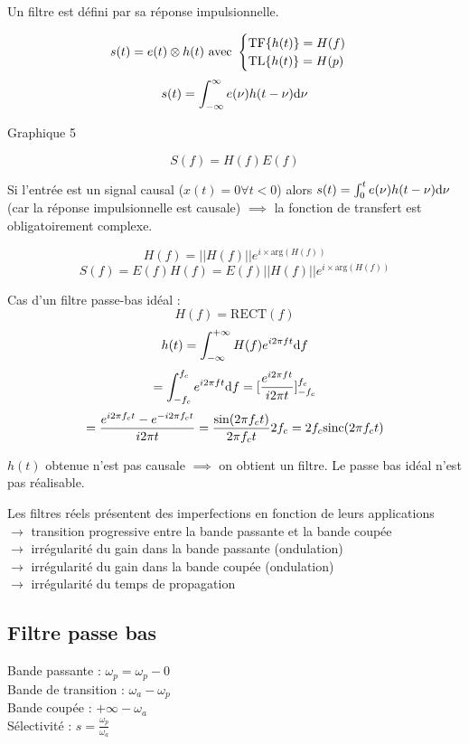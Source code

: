 \documentclass[a4paper,12pt]{article}
\begin{document}
Un filtre est défini par sa réponse impulsionnelle.

\[ s(t) = e(t) \otimes h(t) \text{ avec } \begin{cases}
    \mathrm{TF} \{ h(t) \} = H(f) \\
    \mathrm{TL} \{ h(t) \} = H(p)
\end{cases} \]
\[ s(t) = \int_{-\infty}^{\infty} e(\nu) h(t-\nu) \mathrm{d}\nu \]

{\Large Graphique 5}

\[ S(f) = H(f) E(f) \]

Si l'entrée est un signal causal ($x(t) = 0 \forall t < 0$) alors $s(t) = \int_0^t e(\nu) h(t-\nu) \mathrm{d}\nu$ (car la réponse impulsionnelle est causale) $\implies$ la fonction de transfert est obligatoirement complexe.

\[ H(f) = ||H(f)|| e^{i \times \textrm{arg}(H(f))} \]
\[ S(f) = E(f) H(f) = E(f) ||H(f)|| e^{i \times \textrm{arg}(H(f))} \]

Cas d'un filtre passe-bas idéal :
\[ H(f) = \textrm{RECT}(f) \]
\[ h(t) = \int_{-\infty}^{+\infty} H(f) e^{i2\pi ft} \mathrm{d}f \]
\[ = \int_{-f_c}^{f_c} e^{i2\pi ft} \mathrm{d}f = [ \frac{e^{i2\pi ft}}{i2\pi t} ]_{-f_c}^{f_c} \]
\[ = \frac{e^{i2\pi f_ct} - e^{-i2\pi f_ct}}{i2\pi t} = \frac{\sin(2\pi f_c t)}{2\pi f_c t} 2f_c = 2f_c \mathrm{sinc}(2\pi f_c t) \]

$h(t)$ obtenue n'est pas causale $\implies$ on obtient un filtre.
Le passe bas idéal n'est pas réalisable.

Les filtres réels présentent des imperfections en fonction de leurs applications \\
$\rightarrow$ transition progressive entre la bande passante et la bande coupée \\
$\rightarrow$ irrégularité du gain dans la bande passante (ondulation) \\
$\rightarrow$ irrégularité du gain dans la bande coupée (ondulation) \\
$\rightarrow$ irrégularité du temps de propagation

\subsection{Filtre passe bas}

Bande passante : $\omega_p = \omega_p - 0$ \\
Bande de transition : $\omega_a - \omega_p$ \\
Bande coupée : $+\infty - \omega_a$ \\
Sélectivité : $s = \frac{\omega_p}{\omega_a}$
\end{document}
